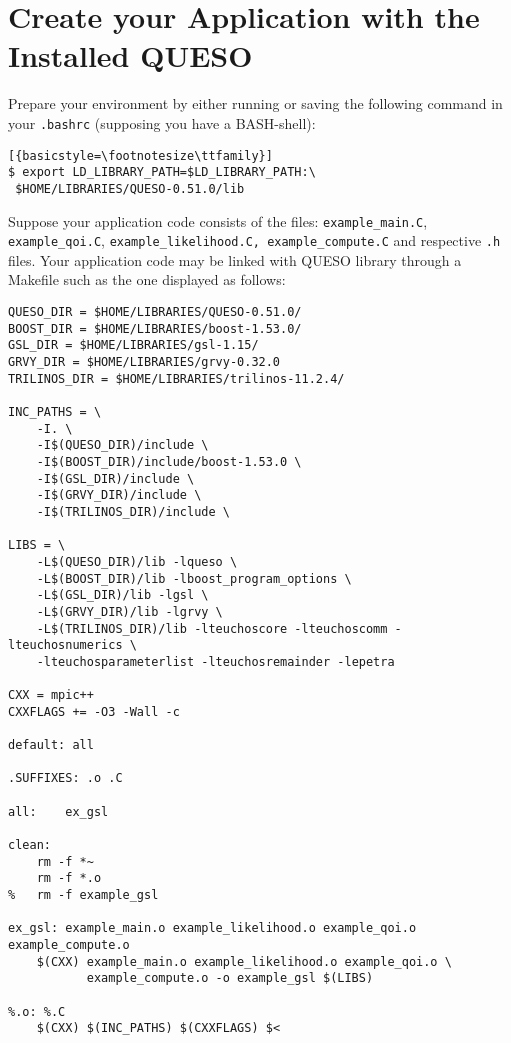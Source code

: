 \section{Create your Application with the Installed QUESO} \label{sc-use-queso}

Prepare your environment by either running or saving the following command in
your \verb+.bashrc+ (supposing you have a BASH-shell):
\begin{lstlisting}[{basicstyle=\footnotesize\ttfamily}]
$ export LD_LIBRARY_PATH=$LD_LIBRARY_PATH:\
 $HOME/LIBRARIES/QUESO-0.51.0/lib
\end{lstlisting}



Suppose your application code consists of the files:  \verb+example_main.C+,
\verb+example_qoi.C+,  \verb+example_likelihood.C, example_compute.C+ and
respective \verb+.h+ files. Your application code may be linked with QUESO
library through a Makefile such as the one displayed as follows:

\begin{lstlisting}[basicstyle={\footnotesize\ttfamily},deletekeywords={export,rm}]
QUESO_DIR = $HOME/LIBRARIES/QUESO-0.51.0/
BOOST_DIR = $HOME/LIBRARIES/boost-1.53.0/
GSL_DIR = $HOME/LIBRARIES/gsl-1.15/
GRVY_DIR = $HOME/LIBRARIES/grvy-0.32.0
TRILINOS_DIR = $HOME/LIBRARIES/trilinos-11.2.4/

INC_PATHS = \
	-I. \
	-I$(QUESO_DIR)/include \
	-I$(BOOST_DIR)/include/boost-1.53.0 \
	-I$(GSL_DIR)/include \
	-I$(GRVY_DIR)/include \
	-I$(TRILINOS_DIR)/include \

LIBS = \
	-L$(QUESO_DIR)/lib -lqueso \
	-L$(BOOST_DIR)/lib -lboost_program_options \
	-L$(GSL_DIR)/lib -lgsl \
	-L$(GRVY_DIR)/lib -lgrvy \
	-L$(TRILINOS_DIR)/lib -lteuchoscore -lteuchoscomm -lteuchosnumerics \
	-lteuchosparameterlist -lteuchosremainder -lepetra

CXX = mpic++
CXXFLAGS += -O3 -Wall -c

default: all

.SUFFIXES: .o .C

all:	ex_gsl

clean:
	rm -f *~
	rm -f *.o
% 	rm -f example_gsl

ex_gsl: example_main.o example_likelihood.o example_qoi.o example_compute.o
	$(CXX) example_main.o example_likelihood.o example_qoi.o \
	       example_compute.o -o example_gsl $(LIBS)

%.o: %.C
	$(CXX) $(INC_PATHS) $(CXXFLAGS) $<
\end{lstlisting}
% 
